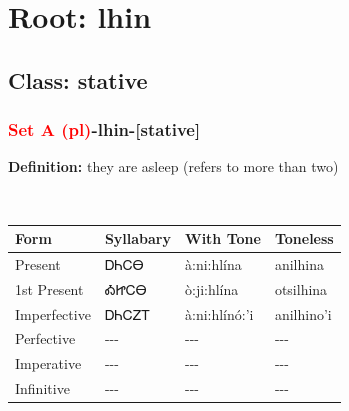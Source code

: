 \needspace{4in}
\section*{Root: lhin}
\nopagebreak
{}
\needspace{3in}
\subsection*{Class: stative}
\nopagebreak
\needspace{2in}
\subsubsection*{\textcolor{Red}{Set A (pl)}{-}\textbf{lhin}{-}[stative]}
\nopagebreak
\textbf{Definition: } they are asleep (refers to more than two)
\\[0.5em]
\begin{tabularx}{\textwidth}{l X X X}%
\toprule%
\textbf{Form}&\textbf{Syllabary}&\textbf{With Tone}&\textbf{Toneless}\\%
\midrule%
Present&ᎠᏂᏟᎾ&à:ni:hlína&anilhina\\%
1st Present&ᎣᏥᏟᎾ&ò:ji:hlína&otsilhina\\%
Imperfective&ᎠᏂᏟᏃᎢ&à:ni:hlínó:’i&anilhino'i\\%
Perfective&{-}{-}{-}&{-}{-}{-}&{-}{-}{-}\\%
Imperative&{-}{-}{-}&{-}{-}{-}&{-}{-}{-}\\%
Infinitive&{-}{-}{-}&{-}{-}{-}&{-}{-}{-}\\%
\bottomrule%
\end{tabularx}
\\[1em]
